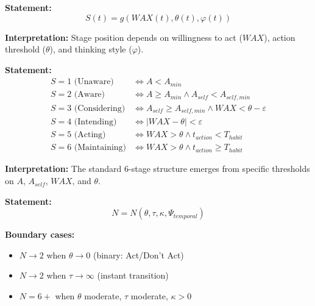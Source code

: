 \begin{tcolorbox}[colback=gray!5!white, colframe=gray!75!black,
    title=Axiom BCJ-E2: Stage Emergence from Willingness]
\textbf{Statement:}
\begin{equation}
S(t) = g(WAX(t), \theta(t), \varphi(t))
\end{equation}

\textbf{Interpretation:} Stage position depends on willingness to act ($WAX$), action threshold ($\theta$), and thinking style ($\varphi$).
\end{tcolorbox}

\begin{tcolorbox}[colback=gray!5!white, colframe=gray!75!black,
    title=Axiom BCJ-E3: Combined Emergence]
\textbf{Statement:}
\begin{align}
S = 1 \text{ (Unaware)} &\Leftrightarrow A < A_{min} \\
S = 2 \text{ (Aware)} &\Leftrightarrow A \geq A_{min} \land A_{self} < A_{self,min} \\
S = 3 \text{ (Considering)} &\Leftrightarrow A_{self} \geq A_{self,min} \land WAX < \theta - \varepsilon \\
S = 4 \text{ (Intending)} &\Leftrightarrow |WAX - \theta| < \varepsilon \\
S = 5 \text{ (Acting)} &\Leftrightarrow WAX > \theta \land t_{action} < T_{habit} \\
S = 6 \text{ (Maintaining)} &\Leftrightarrow WAX > \theta \land t_{action} \geq T_{habit}
\end{align}

\textbf{Interpretation:} The standard 6-stage structure emerges from specific thresholds on $A$, $A_{self}$, $WAX$, and $\theta$.
\end{tcolorbox}

\begin{tcolorbox}[colback=gray!5!white, colframe=gray!75!black,
    title=Axiom BCJ-E4: Endogenous Stage Number]
\textbf{Statement:}
\begin{equation}
N = N(\theta, \tau, \kappa, \Psi_{temporal})
\end{equation}

\textbf{Boundary cases:}
\begin{itemize}[nosep]
\item $N \to 2$ when $\theta \to 0$ (binary: Act/Don't Act)
\item $N \to 2$ when $\tau \to \infty$ (instant transition)
\item $N = 6+$ when $\theta$ moderate, $\tau$ moderate, $\kappa > 0$
\end{itemize}
\end{tcolorbox}

